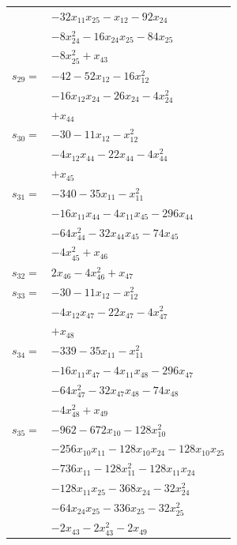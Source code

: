 \begin{longtable}{@{}r@{\;}l@{}}
 & \(\displaystyle -32x_{11}x_{25} -x_{12} -92x_{24}\) \\
 & \(\displaystyle -8x_{24}^{2} -16x_{24}x_{25} -84x_{25}\) \\
 & \(\displaystyle -8x_{25}^{2} +x_{43}\) \\[3pt]
\(s_{29}=\) & \(\displaystyle -42 -52x_{12} -16x_{12}^{2}\) \\
 & \(\displaystyle -16x_{12}x_{24} -26x_{24} -4x_{24}^{2}\) \\
 & \(\displaystyle +x_{44}\) \\[3pt]
\(s_{30}=\) & \(\displaystyle -30 -11x_{12} -x_{12}^{2}\) \\
 & \(\displaystyle -4x_{12}x_{44} -22x_{44} -4x_{44}^{2}\) \\
 & \(\displaystyle +x_{45}\) \\[3pt]
\(s_{31}=\) & \(\displaystyle -340 -35x_{11} -x_{11}^{2}\) \\
 & \(\displaystyle -16x_{11}x_{44} -4x_{11}x_{45} -296x_{44}\) \\
 & \(\displaystyle -64x_{44}^{2} -32x_{44}x_{45} -74x_{45}\) \\
 & \(\displaystyle -4x_{45}^{2} +x_{46}\) \\[3pt]
\(s_{32}=\) & \(\displaystyle 2x_{46} -4x_{46}^{2} +x_{47}\) \\[3pt]
\(s_{33}=\) & \(\displaystyle -30 -11x_{12} -x_{12}^{2}\) \\
 & \(\displaystyle -4x_{12}x_{47} -22x_{47} -4x_{47}^{2}\) \\
 & \(\displaystyle +x_{48}\) \\[3pt]
\(s_{34}=\) & \(\displaystyle -339 -35x_{11} -x_{11}^{2}\) \\
 & \(\displaystyle -16x_{11}x_{47} -4x_{11}x_{48} -296x_{47}\) \\
 & \(\displaystyle -64x_{47}^{2} -32x_{47}x_{48} -74x_{48}\) \\
 & \(\displaystyle -4x_{48}^{2} +x_{49}\) \\[3pt]
\(s_{35}=\) & \(\displaystyle -962 -672x_{10} -128x_{10}^{2}\) \\
 & \(\displaystyle -256x_{10}x_{11} -128x_{10}x_{24} -128x_{10}x_{25}\) \\
 & \(\displaystyle -736x_{11} -128x_{11}^{2} -128x_{11}x_{24}\) \\
 & \(\displaystyle -128x_{11}x_{25} -368x_{24} -32x_{24}^{2}\) \\
 & \(\displaystyle -64x_{24}x_{25} -336x_{25} -32x_{25}^{2}\) \\
 & \(\displaystyle -2x_{43} -2x_{43}^{2} -2x_{49}\) \\

\end{longtable}
